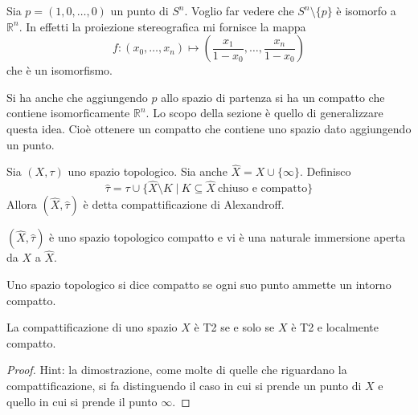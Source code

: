 \begin{ex}
    Sia $p=(1,0,\dots,0)$ un punto di $S^n$. Voglio far vedere che $S^n\setminus\{p\}$ \`e isomorfo a $\mathbb{R}^n$. In effetti la proiezione stereografica mi fornisce la mappa
    \[
        f\colon(x_0, \dots, x_n)\mapsto(\frac{x_1}{1-x_0}, \dots, \frac{x_n}{1-x_0})
    \]
    che \`e un isomorfismo.

    Si ha anche che aggiungendo $p$ allo spazio di partenza si ha un compatto che contiene isomorficamente $\mathbb{R}^n$. Lo scopo della sezione \`e quello di generalizzare questa idea. Cio\`e ottenere un compatto che contiene uno spazio dato aggiungendo un punto.
\end{ex}

\begin{defn}
    Sia $(X,\tau)$ uno spazio topologico. Sia anche $\hat{X} = X \cup \{\infty\}$. Definisco
    \[
        \hat{\tau} = \tau \cup \{\hat{X}\setminus K\; |\ K \subseteq \hat{X}\  \text{chiuso e compatto}\}
    \]
    Allora $(\hat{X}, \hat{\tau})$ \`e detta compattificazione di Alexandroff.
\end{defn}

\begin{oss}
    $(\hat{X}, \hat{\tau})$ \`e uno spazio topologico compatto e vi \`e una naturale immersione aperta da $X$ a $\hat{X}$.
\end{oss}

\begin{defn}
    Uno spazio topologico si dice compatto se ogni suo punto ammette un intorno compatto.
\end{defn}

\begin{prop}
    La compattificazione di uno spazio $X$ \`e T2 se e solo se $X$ \`e T2 e localmente compatto.
\end{prop}
\begin{proof}
    Hint: la dimostrazione, come molte di quelle che riguardano la compattificazione, si fa distinguendo il caso in cui si prende un punto di $X$ e quello in cui si prende il punto $\infty$.
\end{proof}
